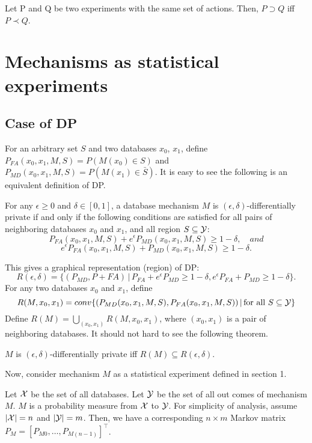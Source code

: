 \documentclass[11pt]{article}
\begin{document}
\begin{theorem}
[Blackwell's] Let P and Q be two experiments with the same set of actions. Then, $P \supset Q$ iff $P \prec Q$.
\end{theorem}

\section{Mechanisms as statistical experiments}

\subsection{Case of DP}
For an arbitrary set $S$ and two databases $x_{0}$, $x_{1}$, define $P_{FA} (x_{0}, x_{1}, M , S) = P(M(x_{0}) \in S)$ and $P_{MD} (x_{0}, x_{1}, M , S) = P(M(x_{1}) \in \bar{S})$. It is easy to see the following is an equivalent definition of DP.
\begin{theorem}
For any $\epsilon \geq 0$ and $\delta \in [0, 1]$, a database mechanism $M$ is $(\epsilon, \delta)$-differentially private if and only if the following conditions are satisfied for all pairs of neighboring databases $x_0$ and $x_1$, and all region $S \subseteq {\cal Y}$:
\[
P_{FA}(x_{0},x_{1},M,S)+e^{\epsilon}P_{MD}(x_{0},x_{1},M,S) \geq 1-\delta , \quad and
\]
\[
e^{\epsilon}P_{FA}(x_{0},x_{1},M,S)+P_{MD}(x_{0},x_{1},M,S) \geq 1-\delta .
\]
\end{theorem}
This gives a graphical representation (region) of DP:
\[
R(\epsilon, \delta) = \{(P_{MD},P+{FA}) \,|\, P_{FA}+e^{\epsilon}P_{MD} \geq1 - \delta,  e^{\epsilon}P_{FA}+P_{MD} \geq 1 - \delta\} .
\]
For any two databases $x_{0}$ and $x_{1}$, define
\[
R(M, x_{0}, x_{1}) = conv \{(P_{MD}(x_{0}, x_{1}, M, S), P_{FA}(x_{0}, x_{1}, M, S)) \,|\, \text{for all }S \subseteq {\cal Y} \}
\] 
Define $R(M) = \bigcup_{(x_{0}, x_{1})} R(M, x_{0}, x_{1}) $, where $(x_{0}, x_{1})$ is a pair of neighboring databases. It should not hard to see the following theorem.

\begin{theorem}
 $M$ is $(\epsilon, \delta)$-differentially private iff $R(M) \subseteq R(\epsilon, \delta) $.
 \end{theorem}
 
 Now, consider mechanism $M$ as a statistical experiment defined in section 1. 
 
 Let ${\cal X} $ be the set of all databases. Let ${\cal Y}$ be the set of all out comes of mechanism $M$. $M$ is a probability measure from $\cal X$ to $\cal Y$. For simplicity of analysis, assume $|{\cal X}| =n $ and $|{\cal Y}|=m$. Then, we have a corresponding $n \times m$ Markov matrix $P_{M} =[P_{M0}, \dots , P_{M(n-1)}]^{\top}$.
 
\end{document}
